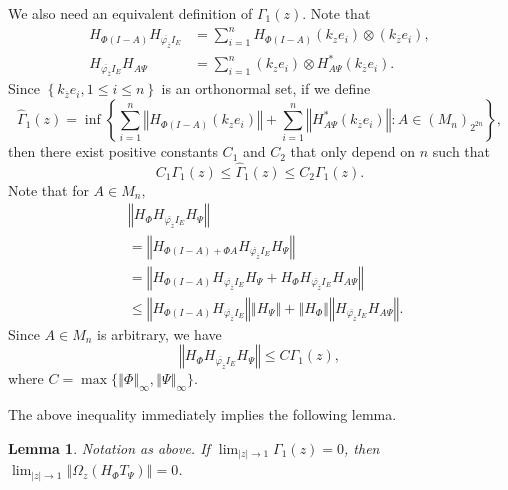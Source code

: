 \documentclass{article}%
\newtheorem{lemma}[theorem]{Lemma}
\begin{document}
We also need an equivalent definition of $\Gamma_{1}(z).$ Note that
\begin{align*}
H_{\Phi(I-A)}H_{\overline{\varphi_{\overline{z}}}I_{E}}  &  =\sum_{i=1}%
^{n}H_{\Phi(I-A)}\left(  k_{z}e_{i}\right)  \otimes\left(  k_{\overline{z}%
}e_{i}\right)  ,\\
H_{\overline{\varphi_{\overline{z}}}I_{E}}H_{A\Psi}  &  =\sum_{i=1}^{n}\left(
k_{z}e_{i}\right)  \otimes H_{A\Psi}^{\ast}\left(  k_{\overline{z}}%
e_{i}\right)  .
\end{align*}
Since $\left\{  k_{\overline{z}}e_{i},1\leq i\leq n\right\}  $ is an
orthonormal set, if we define%
\[
\widehat{\Gamma}_{1}(z)=\inf\left\{  \sum_{i=1}^{n}\left\Vert H_{\Phi
(I-A)}\left(  k_{z}e_{i}\right)  \right\Vert +\sum_{i=1}^{n}\left\Vert
H_{A\Psi}^{\ast}\left(  k_{\overline{z}}e_{i}\right)  \right\Vert :A\in\left(
M_{n}\right)  _{2^{2n}}\right\}  ,
\]
then there exist positive constants $C_{1}$ and $C_{2}$ that only depend on
$n$ such that
\begin{equation}
C_{1}\Gamma_{1}(z)\leq\widehat{\Gamma}_{1}(z)\leq C_{2}\Gamma_{1}(z).
\label{gammahat}%
\end{equation}
Note that for $A\in M_{n},$
\begin{align*}
&  \left\Vert H_{\Phi}H_{\overline{\varphi_{\overline{z}}}I_{E}}H_{\Psi
}\right\Vert \\
&  =\left\Vert H_{\Phi(I-A)+\Phi A}H_{\overline{\varphi_{\overline{z}}}I_{E}%
}H_{\Psi}\right\Vert \\
&  =\left\Vert H_{\Phi(I-A)}H_{\overline{\varphi_{\overline{z}}}I_{E}}H_{\Psi
}+H_{\Phi}H_{\overline{\varphi_{\overline{z}}}I_{E}}H_{A\Psi}\right\Vert \\
&  \leq\left\Vert H_{\Phi(I-A)}H_{\overline{\varphi_{\overline{z}}}I_{E}%
}\right\Vert \left\Vert H_{\Psi}\right\Vert +\left\Vert H_{\Phi}\right\Vert
\left\Vert H_{\overline{\varphi_{\overline{z}}}I_{E}}H_{A\Psi}\right\Vert .
\end{align*}
Since $A\in M_{n}$ is arbitrary, we have
\begin{equation}
\left\Vert H_{\Phi}H_{\overline{\varphi_{\overline{z}}}I_{E}}H_{\Psi
}\right\Vert \leq C\Gamma_{1}(z), \label{gamma1}%
\end{equation}
where $C=\max\{\left\Vert \Phi\right\Vert _{\infty},\left\Vert \Psi\right\Vert
_{\infty}\}.$

The above inequality immediately implies the following lemma.

\begin{lemma}
\label{easy}Notation as above. If $\lim_{\left\vert z\right\vert \rightarrow
1}\Gamma_{1}(z)=0$, then $\lim_{\left\vert z\right\vert \rightarrow
1}\left\Vert \Omega_{z}(H_{\Phi}T_{\Psi})\right\Vert =0$.
\end{lemma}
\end{document}
